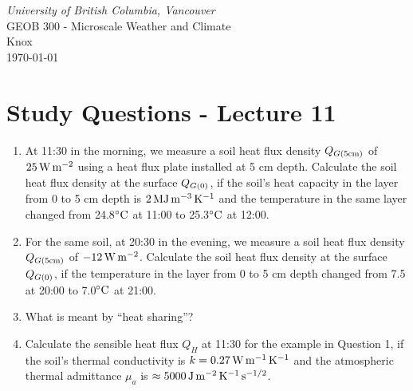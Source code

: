 \documentclass[11pt]{article}
\author{Andy Black and Andreas Christen}
\begin{document}
\begin{center}
\emph{University of British Columbia, Vancouver}\\
GEOB 300 - Microscale Weather and Climate\\
Knox\\
\today

\section*{Study Questions - Lecture 11}
\end{center}

\begin{enumerate}

\item At 11:30 in the morning, we measure a soil heat flux density $Q_{G(\rm{5cm})}$ of $25\,\rm{W}\,\rm{m}^{-2}$ using a heat flux plate installed at 5 cm depth. Calculate the soil heat flux density at the surface $Q_{G(\rm{0})}$, if the soil's heat capacity in the layer from 0 to 5 cm depth is $2 \,\rm{MJ}\,\rm{m}^{-3}\,\rm{K}^{-1}$ and the temperature in the same layer changed from 24.8$^{\circ}\rm{C}$ at 11:00 to 25.3$^{\circ}\rm{C}$ at 12:00.

\item For the same soil, at 20:30 in the evening, we measure a soil heat flux density $Q_{G(\rm{5cm})}$ of $-12\,\rm{W}\,\rm{m}^{-2}$. Calculate the soil heat flux density at the surface $Q_{G(\rm{0})}$, if the temperature in the layer from 0 to 5 cm depth changed from 7.5 at 20:00 to 7.0$^{\circ}\rm{C}$ at 21:00.

\item What is meant by ``heat sharing''?

\item Calculate the sensible heat flux $Q_H$ at 11:30 for the example in Question 1, if the soil's thermal conductivity is $k = 0.27\,\rm{W}\,\rm{m}^{-1}\,\rm{K}^{-1}$ and the atmospheric thermal admittance $\mu_a$ is $\approx 5000 \,\rm{J} \,\rm{m}^{-2} \,\rm{K}^{-1} \,\rm{s}^{-1/2}$.

\end{enumerate}
\end{document}
